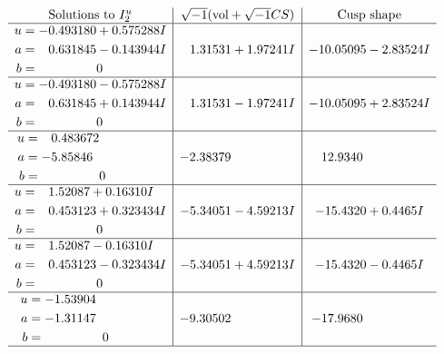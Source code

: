 \documentclass[1p]{elsarticle_modified}
\theoremstyle{definition}
\newcommand{\I}{\sqrt{-1}}
\begin{document}
$$\begin{array}{c|c|c}  
\text{Solutions to }I^u_{2}& \I (\text{vol} + \sqrt{-1}CS) & \text{Cusp shape}\\
 \hline 
\begin{aligned}
u &= -0.493180 + 0.575288 I \\
a &= \phantom{-}0.631845 - 0.143944 I \\
b &= \phantom{-0.000000 } 0\end{aligned}
 & \phantom{-}1.31531 + 1.97241 I & -10.05095 - 2.83524 I \\ \hline\begin{aligned}
u &= -0.493180 - 0.575288 I \\
a &= \phantom{-}0.631845 + 0.143944 I \\
b &= \phantom{-0.000000 } 0\end{aligned}
 & \phantom{-}1.31531 - 1.97241 I & -10.05095 + 2.83524 I \\ \hline\begin{aligned}
u &= \phantom{-}0.483672\phantom{ +0.000000I} \\
a &= -5.85846\phantom{ +0.000000I} \\
b &= \phantom{-0.000000 } 0\end{aligned}
 & -2.38379\phantom{ +0.000000I} & \phantom{-}12.9340\phantom{ +0.000000I} \\ \hline\begin{aligned}
u &= \phantom{-}1.52087 + 0.16310 I \\
a &= \phantom{-}0.453123 + 0.323434 I \\
b &= \phantom{-0.000000 } 0\end{aligned}
 & -5.34051 - 4.59213 I & -15.4320 + 0.4465 I \\ \hline\begin{aligned}
u &= \phantom{-}1.52087 - 0.16310 I \\
a &= \phantom{-}0.453123 - 0.323434 I \\
b &= \phantom{-0.000000 } 0\end{aligned}
 & -5.34051 + 4.59213 I & -15.4320 - 0.4465 I \\ \hline\begin{aligned}
u &= -1.53904\phantom{ +0.000000I} \\
a &= -1.31147\phantom{ +0.000000I} \\
b &= \phantom{-0.000000 } 0\end{aligned}
 & -9.30502\phantom{ +0.000000I} & -17.9680\phantom{ +0.000000I}\\
 \hline 
 \end{array}$$\newpage\newpage\renewcommand{\arraystretch}{1}
\end{document}
